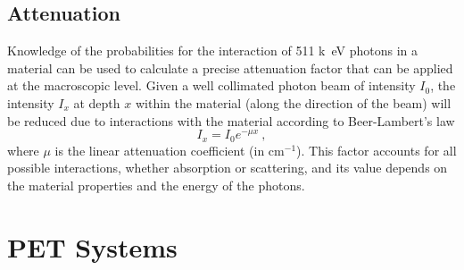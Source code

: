 \subsection{Attenuation}
Knowledge of the probabilities for the interaction of 511 \si{k\electronvolt} photons in a material can be used to calculate a precise attenuation factor that can be applied at the macroscopic level. Given a well collimated photon beam of intensity $I_0$, the intensity $I_x$ at depth $x$ within the material (along the direction of the beam) will be reduced due to interactions with the material according to Beer-Lambert's law
\begin{equation} \label{Attenuation}
I_x = I_0 e^{-\mu x} \ ,
\end{equation}
where $\mu$ is the linear attenuation coefficient (in cm$^{-1}$). This factor accounts for all possible interactions, whether absorption or scattering, and its value depends on the material properties and the energy of the photons.
%
%
%
\section{PET Systems}

